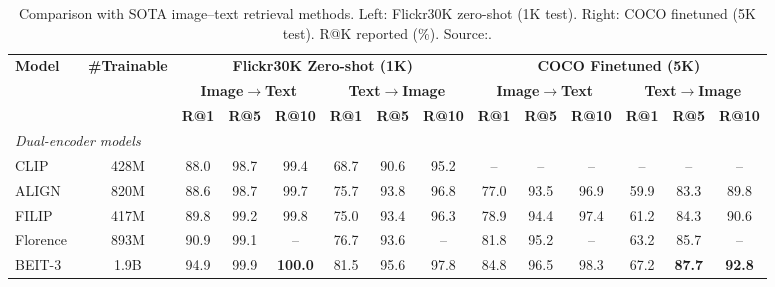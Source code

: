 \begin{enrichment}
\begin{enrichment}
        
        \begin{table}[H]
            \centering
            \caption{Comparison with SOTA image--text retrieval methods. Left: Flickr30K zero-shot (1K test). Right: COCO finetuned (5K test). R@K reported (\%). Source:\cite{li2023_blip2}.}
            \label{tab:blip2_retrieval}
            \footnotesize
            \setlength{\tabcolsep}{4pt}
            \begin{tabular}{lccccccccccccc}
                \toprule
                \textbf{Model} & \textbf{\#Trainable} &
                \multicolumn{6}{c}{\textbf{Flickr30K Zero-shot (1K)}} &
                \multicolumn{6}{c}{\textbf{COCO Finetuned (5K)}} \\
                \cmidrule(lr){3-8}\cmidrule(lr){9-14}
                &  &
                \multicolumn{3}{c}{\textbf{Image$\rightarrow$Text}} &
                \multicolumn{3}{c}{\textbf{Text$\rightarrow$Image}} &
                \multicolumn{3}{c}{\textbf{Image$\rightarrow$Text}} &
                \multicolumn{3}{c}{\textbf{Text$\rightarrow$Image}} \\
                \cmidrule(lr){3-5}\cmidrule(lr){6-8}\cmidrule(lr){9-11}\cmidrule(lr){12-14}
                &  & \textbf{R@1} & \textbf{R@5} & \textbf{R@10} & \textbf{R@1} & \textbf{R@5} & \textbf{R@10} & \textbf{R@1} & \textbf{R@5} & \textbf{R@10} & \textbf{R@1} & \textbf{R@5} & \textbf{R@10} \\
                \midrule
                \multicolumn{14}{l}{\emph{Dual-encoder models}} \\
                CLIP~\cite{radford2021_clip}      & 428M  & 88.0 & 98.7 & 99.4 & 68.7 & 90.6 & 95.2 & --   & --   & --   & --   & --   & --   \\
                ALIGN~\cite{jia2021_align}        & 820M  & 88.6 & 98.7 & 99.7 & 75.7 & 93.8 & 96.8 & 77.0 & 93.5 & 96.9 & 59.9 & 83.3 & 89.8 \\
                FILIP~\cite{yao2022_filip}        & 417M  & 89.8 & 99.2 & 99.8 & 75.0 & 93.4 & 96.3 & 78.9 & 94.4 & 97.4 & 61.2 & 84.3 & 90.6 \\
                Florence~\cite{yuan2021_florence} & 893M  & 90.9 & 99.1 & --   & 76.7 & 93.6 & --   & 81.8 & 95.2 & --   & 63.2 & 85.7 & --   \\
                BEIT-3~\cite{wang2022_beit3}      & 1.9B  & 94.9 & 99.9 & \textbf{100.0} & 81.5 & 95.6 & 97.8 & 84.8 & 96.5 & 98.3 & 67.2 & \textbf{87.7} & \textbf{92.8} \\

\end{tabular}
\end{table}
\end{enrichment}
\end{enrichment}
